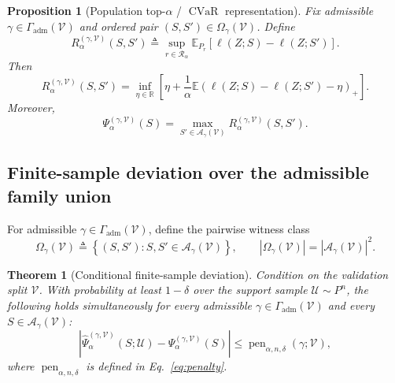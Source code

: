 \documentclass{article}
\newtheorem{theorem}{Theorem}
\newtheorem{proposition}{Proposition}
\newcommand{\RR}{\mathbb{R}}
\newcommand{\EE}{\mathbb{E}}
\newcommand{\cA}{\mathcal{A}}
\newcommand{\cR}{\mathcal{R}}
\newcommand{\cU}{\mathcal{U}}
\newcommand{\cV}{\mathcal{V}}
\newcommand{\CVaR}{\operatorname{CVaR}}
\newcommand{\braces}[1]{\left\{ #1 \right\}}
\newcommand{\paren}[1]{\left( #1 \right)}
\newcommand{\bracks}[1]{\left[ #1 \right]}
\newcommand{\loss}{\ell}
\newcommand{\1}{\mathbbm{1}}
\begin{document}
\begin{proposition}[Population top-\(\alpha\) / \(\CVaR\) representation]
\label{prop:population_top_alpha}
Fix admissible \(\gamma\in\Gamma_{\mathrm{adm}}(\cV)\) and ordered pair \((S,S')\in\Omega_\gamma(\cV)\). Define
\begin{equation}
    R^{(\gamma,\cV)}_\alpha(S,S')
    \triangleq
    \sup_{r\in\cR_\alpha}
    \EE_{P_r}\!\left[\loss(Z;S)-\loss(Z;S')\right].
    \label{eq:population_pairwise}
\end{equation}
Then
\begin{equation}
    R^{(\gamma,\cV)}_\alpha(S,S')
    =
    \inf_{\eta\in\RR}
    \bracks{
        \eta + \frac{1}{\alpha}\EE\paren{\loss(Z;S)-\loss(Z;S')-\eta}_+
    }.
    \label{eq:population_cvar}
\end{equation}
Moreover,
\begin{equation}
    \Psi^{(\gamma,\cV)}_\alpha(S)
    =
    \max_{S'\in\cA_\gamma(\cV)}
    R^{(\gamma,\cV)}_\alpha(S,S').
    \label{eq:population_max_pair}
\end{equation}
\end{proposition}

\subsection{Finite-sample deviation over the admissible family union}

For admissible \(\gamma\in\Gamma_{\mathrm{adm}}(\cV)\), define the pairwise witness class
\begin{equation}
    \Omega_\gamma(\cV)
    \triangleq
    \braces{
        (S,S') :
        S,S'\in\cA_\gamma(\cV)
    },
    \qquad
    |\Omega_\gamma(\cV)| = |\cA_\gamma(\cV)|^2.
    \label{eq:pair_class}
\end{equation}

\begin{theorem}[Conditional finite-sample deviation]
\label{thm:deviation}
Condition on the validation split \(\cV\). With probability at least \(1-\delta\) over the support sample \(\cU\sim P^n\), the following holds simultaneously for every admissible \(\gamma\in\Gamma_{\mathrm{adm}}(\cV)\) and every \(S\in\cA_\gamma(\cV)\):
\begin{equation}
    \left|
        \widehat{\Psi}^{(\gamma,\cV)}_\alpha(S;\cU)
        -
        \Psi^{(\gamma,\cV)}_\alpha(S)
    \right|
    \le
    \operatorname{pen}_{\alpha,n,\delta}(\gamma;\cV),
    \label{eq:uniform_deviation}
\end{equation}
where \(\operatorname{pen}_{\alpha,n,\delta}\) is defined in Eq.~\eqref{eq:penalty}.
\end{theorem}
\end{document}
